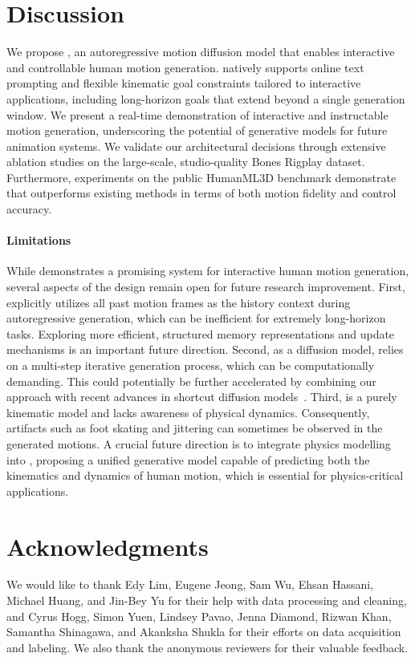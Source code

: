 \section{Discussion}
\label{sec:discussion}
We propose \method, an autoregressive motion diffusion model that enables interactive and controllable human motion generation. \method natively supports online text prompting and flexible kinematic goal constraints tailored to interactive applications, including long-horizon goals that extend beyond a single generation window. 
We present a real-time demonstration of interactive and instructable motion generation, underscoring the potential of generative models for future animation systems.
We validate our architectural decisions through extensive ablation studies on the large-scale, studio-quality Bones Rigplay dataset. Furthermore, experiments on the public HumanML3D benchmark demonstrate that \method outperforms existing methods in terms of both motion fidelity and control accuracy.

\paragraph{Limitations}
While \method demonstrates a promising system for interactive human motion generation, several aspects of the design remain open for future research improvement.
First, \method explicitly utilizes all past motion frames as the history context during autoregressive generation, which can be inefficient for extremely long-horizon tasks. Exploring more efficient, structured memory representations and update mechanisms is an important future direction.
Second, as a diffusion model, \method relies on a multi-step iterative generation process, which can be computationally demanding. This could potentially be further accelerated by combining our approach with recent advances in shortcut diffusion models~\cite{lu2025simplifying, geng2025mean}.
Third, \method is a purely kinematic model and lacks awareness of physical dynamics. Consequently, artifacts such as foot skating and jittering can sometimes be observed in the generated motions. A crucial future direction is to integrate physics modelling into \method, proposing a unified generative model capable of predicting both the kinematics and dynamics of human motion, which is essential for physics-critical applications.



\section{Acknowledgments}
We would like to thank Edy Lim, Eugene Jeong, Sam Wu, Ehsan Hassani, Michael Huang, and Jin-Bey Yu for their help with data processing and cleaning, and Cyrus Hogg, Simon Yuen, Lindsey Pavao, Jenna Diamond, Rizwan Khan, Samantha Shinagawa, and Akanksha Shukla for their efforts on data acquisition and labeling. We also thank the anonymous reviewers for their valuable feedback.
